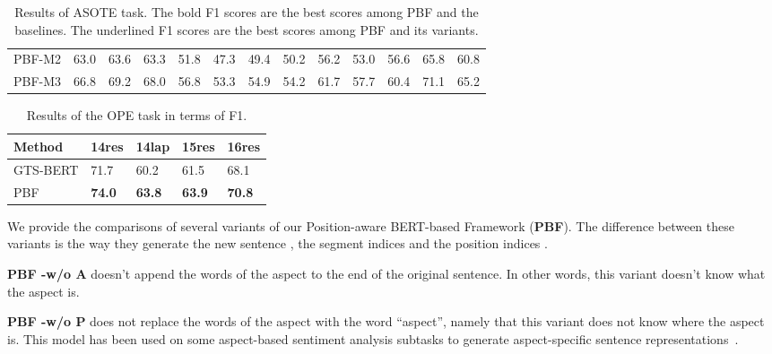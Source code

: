 \documentclass[11pt]{article}
\begin{document}
\begin{table*}
\begin{tabular}{|l|lll|lll|lll|lll|}
		PBF-M2          & 63.0                  & 63.6                  & 63.3                    & 51.8                  & 47.3                  & 49.4                    & 50.2                  & 56.2                  & 53.0                    & 56.6                  & 65.8                  & 60.8                    \\
		PBF-M3          & 66.8                  & 69.2                  & 68.0                    & 56.8                  & 53.3                  & 54.9                    & 54.2                  & 61.7                  & 57.7                    & 60.4                  & 71.1                  & 65.2                    \\ \hline
	\end{tabular}
	\caption{\label{table:ASOTE} Results of ASOTE task. The bold F1 scores are the best scores among PBF and the baselines. The underlined F1 scores are the best scores among PBF and its variants.}
\end{table*}

\begin{table}
	\centering
	\begin{tabular}{|l|l|l|l|l|}
		\hline
		Method   & 14res       & 14lap         & 15res         & 16res         \\ \hline
		GTS-BERT & 71.7        & 60.2          & 61.5          & 68.1          \\ \hline
		PBF      & \textbf{74.0} & \textbf{63.8} & \textbf{63.9} & \textbf{70.8} \\ \hline
	\end{tabular}
	\caption{\label{table:AOPE} Results of the OPE task in terms of F1.}
\end{table}

We provide the comparisons of several variants of our Position-aware BERT-based Framework (\textbf{PBF}).
The difference between these variants is the way they generate the new sentence , the segment indices  and the position indices .

\textbf{PBF -w/o A} doesn't append the words of the aspect to the end of the original sentence. In other words, this variant doesn't know what the aspect is.

\textbf{PBF -w/o P} does not replace the words of the aspect with the word ``aspect'', namely that this variant does not know where the aspect is. This model has been used on some aspect-based sentiment analysis subtasks to generate aspect-specific sentence representations~\citep{jiang-etal-2019-challenge,li-etal-2020-multi-instance}.
\end{document}
